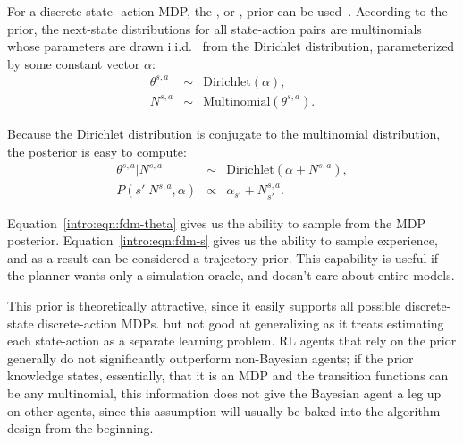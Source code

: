 \label{intro:fdm}

For a discrete-state -action MDP, the , or , prior can be used~\cite{poupart06}. According to the  prior, the next-state distributions for all state-action pairs are multinomials whose parameters are drawn i.i.d. \ from the Dirichlet distribution, parameterized by some constant vector $\alpha$:
\begin{eqnarray}
\theta^{s,a} &\sim& \mbox{Dirichlet}(\alpha),\\
N^{s,a} &\sim& \mbox{Multinomial}(\theta^{s,a}).
\end{eqnarray}

Because the Dirichlet distribution is conjugate to the multinomial distribution, the  posterior is easy to compute:
\begin{eqnarray}
\label{intro:eqn:fdm-theta}\theta^{s,a}|N^{s,a} &\sim& \mbox{Dirichlet}(\alpha+N^{s,a}),\\
\label{intro:eqn:fdm-s}P(s'|N^{s,a},\alpha) &\propto& \alpha_{s'}+N^{s,a}_{s'}.
\end{eqnarray}


Equation~\ref{intro:eqn:fdm-theta} gives us the ability to sample from the MDP posterior. Equation~\ref{intro:eqn:fdm-s} gives us the ability to sample experience, and as a result  can be considered a trajectory prior. This capability is useful if the planner wants only a simulation oracle, and doesn't care about entire models.

This prior is theoretically attractive, since it easily supports all possible discrete-state discrete-action MDPs. but not good at generalizing as it treats estimating each state-action as a separate learning problem.   RL agents that rely on the  prior generally do not significantly outperform non-Bayesian agents\note{[ref?]}; if the prior knowledge states, essentially, that it is an MDP and the transition functions can be any multinomial, this information does not give the Bayesian agent a leg up on other agents, since this assumption will usually be baked into the algorithm design from the beginning. 

